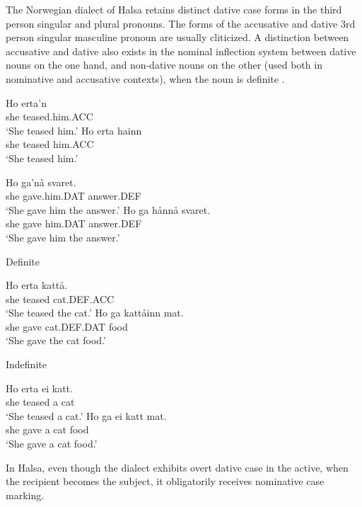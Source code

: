The Norwegian dialect of Halsa retains distinct dative case forms in the third person singular and plural pronouns. The forms of the accusative and dative 3rd person singular masculine pronoun are usually cliticized. A distinction between accusative and dative also exists in the nominal inflection system between dative nouns on the one hand, and non-dative nouns on the other (used both in nominative and accusative contexts), when the noun is definite \citep{Afarli.2012}.
\begin{exe}
\ex
\begin{xlist}
\ex \gll Ho erta'n\\
she teased.him.ACC\\
\trans `She teased him.'
\ex \gll Ho erta hainn\\
she teased him.ACC\\
\trans `She teased him.'
\end{xlist}
\ex
\begin{xlist}
\ex \gll Ho ga'nå svaret.\\
she gave.him.DAT answer.DEF\\
\trans `She gave him the answer.'
\ex \gll Ho ga hånnå svaret.\\
she gave him.DAT answer.DEF\\
\trans `She gave him the answer.'
\end{xlist}
\ex Definite
\begin{xlist}
\ex \gll Ho erta kattå.\\
she teased cat.DEF.ACC\\
\trans `She teased the cat.'
\ex \gll Ho ga kattåinn mat.\\
she gave cat.DEF.DAT food\\
\trans `She gave the cat food.'
\end{xlist}
\ex Indefinite
\begin{xlist}
\ex \gll Ho erta ei katt.\\
she teased a cat\\
\trans `She teased a cat.'
\ex \gll Ho ga ei katt mat.\\
she gave a cat food\\
\trans `She gave a cat food.'
\end{xlist}
\end{exe}

In Halsa, even though the dialect exhibits overt dative case in the active, when the recipient becomes the subject, it obligatorily receives nominative case marking.

\begin{exe}
\ex
\begin{xlist}
\end{xlist}
\end{exe}

